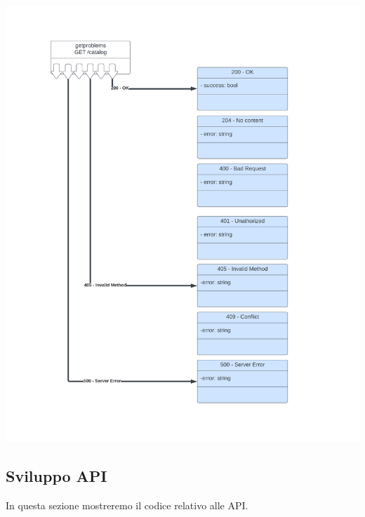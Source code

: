 \documentclass[11pt, a4paper]{article}
\theoremstyle{definition}
\begin{document}
\includegraphics[width=\textwidth]{materiale/Resource Models Problems.png}

\subsection{Sviluppo API}
In questa sezione mostreremo il codice relativo alle API.
\end{document}
